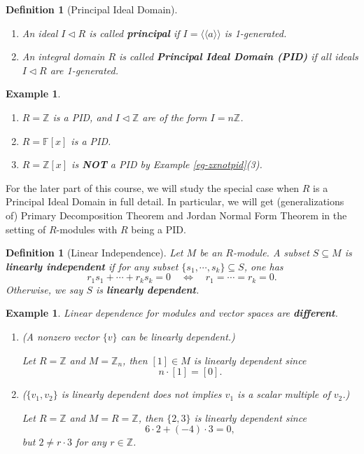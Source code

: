 \documentclass[12pt]{amsbook}
\newtheorem{definition}[theorem]{Definition}
\newtheorem{example}[theorem]{Example}
\begin{document}
\begin{definition}[Principal Ideal Domain]\
    \begin{enumerate}
        \item An ideal $I \lhd R$ is called {\bf principal} if $I=\langle \langle a \rangle \rangle$ is 1-generated.
        \item An integral domain $R$ is called {\bf Principal Ideal Domain (PID)} if all ideals $I \lhd R$ are 1-generated.
    \end{enumerate}
\end{definition}

\begin{example}
    \begin{enumerate}
        \item $R=\mathbb{Z}$ is a PID, and $I\lhd \mathbb{Z}$ are of the form $I=n\mathbb{Z}$.
        \item $R=\mathbb{F}[x]$ is a PID.
        \item $R=\mathbb{Z}[x]$ is {\bf NOT} a PID by Example \ref{eg-zxnotpid}(3).
    \end{enumerate}
\end{example}

For the later part of this course, we will study the special case when $R$ is a Principal Ideal Domain in full detail. In particular, we will get (generalizations of) Primary Decomposition Theorem and Jordan Normal Form Theorem in the setting of $R$-modules with $R$ being a PID.

\begin{definition}[Linear Independence]
    Let $M$ be an $R$-module. A subset $S\subseteq M$ is {\bf linearly independent} if for any subset $\{s_1,\cdots,s_k\}\subseteq S$, one has
    $$r_1s_1+\cdots+r_ks_k=0\quad\Leftrightarrow\quad r_1=\cdots=r_k=0.$$
    Otherwise, we say $S$ is {\bf linearly dependent}.
\end{definition}

\begin{example} \label{eg-ld}
    Linear dependence for modules and vector spaces are {\bf different}.
    \begin{enumerate}
        \item (A nonzero vector $\{v\}$ can be linearly dependent.)

        Let $R=\mathbb{Z}$ and $M=\mathbb{Z}_{n}$, then $[1]\in M$ is linearly dependent since $$n\cdot[1]=[0].$$
        \item ($\{v_1,v_2\}$ is linearly dependent does not implies $v_1$ is a scalar multiple of $v_2$.)

        Let $R=\mathbb{Z}$ and $M=R=\mathbb{Z}$, then $\{2,3\}$ is linearly dependent since
        $$6\cdot 2+(-4)\cdot 3=0,$$
        but $2\neq r\cdot 3$ for any $r \in \mathbb{Z}$.
    \end{enumerate}
\end{example}
\end{document}
